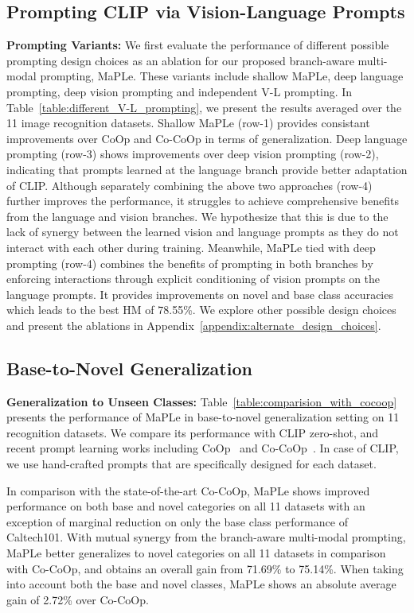 \documentclass[10pt,twocolumn,letterpaper]{article}
\begin{document}
\subsection{Prompting CLIP via Vision-Language Prompts}
\noindent \textbf{Prompting Variants:} We first evaluate the performance of different possible prompting design choices as an ablation for our proposed branch-aware multi-modal prompting, MaPLe. These variants include shallow MaPLe, deep language prompting, deep vision prompting and independent V-L prompting. In Table~\ref{table:different_V-L_prompting}, we present the results averaged over the 11 image recognition datasets. Shallow MaPLe (row-1) provides consistant improvements over CoOp and Co-CoOp in terms of generalization. Deep language prompting (row-3) shows improvements over deep vision prompting (row-2), indicating that prompts learned at the language branch provide better adaptation of CLIP. Although separately combining the above two approaches (row-4) further improves the performance, it struggles to achieve comprehensive benefits from the language and vision branches. We hypothesize that this is due to the lack of synergy between the learned vision and language prompts as they do not interact with each other during training. Meanwhile, MaPLe tied with deep prompting (row-4) combines the benefits of prompting in both branches by enforcing interactions through explicit conditioning of vision prompts on the language prompts. It provides improvements on novel and base class accuracies which leads to the best HM of 78.55\%. We explore other possible design choices and present the ablations in Appendix~\ref{appendix:alternate_design_choices}.

\subsection{Base-to-Novel Generalization}
\label{lab:comparision_base_to_new}
\noindent \textbf{Generalization to Unseen Classes:} Table~\ref{table:comparision_with_cocoop} presents the performance of MaPLe in base-to-novel generalization setting on 11 recognition datasets. We compare its performance with CLIP zero-shot, and recent prompt learning works including CoOp~\cite{zhou2022learning} and Co-CoOp~\cite{zhou2022conditional}. In case of CLIP, we use hand-crafted prompts that are specifically designed for each dataset.

In comparison with the state-of-the-art Co-CoOp, MaPLe shows improved performance on both base and novel categories on all 11 datasets with an exception of marginal reduction on only the base class performance of Caltech101. With mutual synergy from the branch-aware multi-modal prompting, MaPLe better generalizes to novel categories on all 11 datasets in comparison with Co-CoOp, and obtains an overall gain from 71.69\% to 75.14\%. When taking into account both the base and novel classes, MaPLe shows an absolute average gain of 2.72\% over Co-CoOp. 
\end{document}
